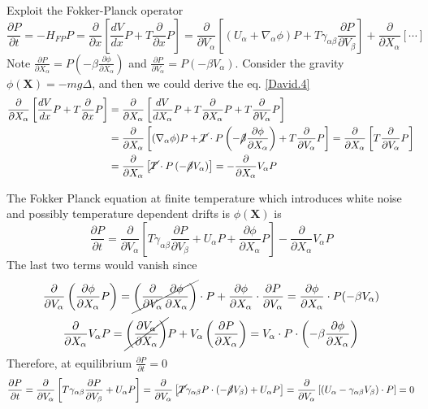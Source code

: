 \documentclass[books,12pt]{elegantpaper}
\newcommand{\pder}[2][]{\frac{\partial#1}{\partial#2}}
\newcommand{\beq}{\begin{equation}}
\newcommand{\eeq}{\end{equation}}
\newcommand{\bgn}{\begin{align}}
\newcommand{\tlag}[1]{\tag{#1} \label{#1}}
\begin{document}
Exploit the Fokker-Planck operator
$$ \pder[P]{t} = - H_{FP} P = \pder{x} \left[ \frac{dV}{dx} P + T \pder{x} P \right] = \pder{V_\alpha} \left[ (U_\alpha + \nabla_\alpha \phi) P + T \gamma_{\alpha\beta} \pder[P]{V_\beta} \right] + \pder{X_\alpha} \left[ \cdots \right] $$
Note $\pder[P]{X_\alpha} = P \left( -\beta \pder[\phi]{X_\alpha} \right)$ and $\pder[P]{V_\alpha} = P \left( -\beta V_\alpha \right)$. Consider the gravity $\phi(\mathbf{X}) = - mg\Delta$, and then we could derive the eq. \ref{David.4}
$$ \bgn
\pder{X_\alpha} \left[ \frac{dV}{dx} P + T \pder{x} P \right] &= \pder{X_\alpha} \left[ \frac{dV}{dX_\alpha} P + T \pder{X_\alpha} P + T \pder{V_\alpha} P \right] \\
&= \pder{X_\alpha} \left[ (\nabla_\alpha\phi)P + \cancel{T} \cdot P \left( -\cancel{\beta} \pder[\phi]{X_\alpha} \right) + T \pder{V_\alpha} P \right] = \pder{X_\alpha} \left[ T \pder{V_\alpha} P \right] \\
&= \pder{X_\alpha} \left[ \cancel{T} \cdot P \left( -\cancel\beta V_\alpha \right) \right] = - \pder{X_\alpha} V_\alpha P
\end{align} $$

The Fokker Planck equation at finite temperature which introduces white noise and possibly temperature dependent drifts is $\phi(\mathbf{X})$ is 
\beq \pder[P]{t} = \pder{V_\alpha} \left[ T \gamma_{\alpha\beta} \pder[P]{V_\beta} + U_\alpha P + \pder[\phi]{X_\alpha} P \right] - \pder{X_\alpha} V_\alpha P  \tlag{David.4} \eeq
The last two terms would vanish since
$$ \pder{V_\alpha} \left( \pder[\phi]{X_\alpha} P \right) = \cancel{ \left( \pder{V_\alpha} \pder[\phi]{X_\alpha} \right) } \cdot P + \pder[\phi]{X_\alpha} \cdot \pder[P]{V_\alpha} = \pder[\phi]{X_\alpha} \cdot P (-\beta V_\alpha) $$
$$ \pder{X_\alpha} V_\alpha P = \cancel{ \left( \pder[V_\alpha]{X_\alpha} \right) } P + V_\alpha \left( \pder[P]{X_\alpha} \right) = V_\alpha \cdot P \cdot \left( -\beta \pder[\phi]{X_\alpha} \right) $$
Therefore, at equilibrium $\pder[P]{t} = 0$
$$ \pder[P]{t} = \pder{V_\alpha} \left[ T \gamma_{\alpha\beta} \pder[P]{V_\beta} + U_\alpha P \right] = \pder{V_\alpha} \left[ \cancel{T} \gamma_{\alpha\beta} P \cdot (- \cancel\beta V_\beta) + U_\alpha P \right] = \pder{V_\alpha} \left[ (U_\alpha - \gamma_{\alpha\beta} V_\beta) \cdot P \right] = 0 $$
\end{document}
